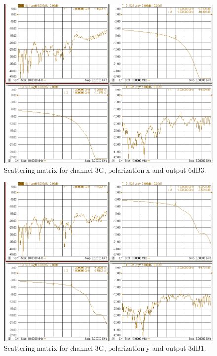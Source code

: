 \documentclass[12pt,a4paper,oneside]{article}
\begin{document}
\begin{figure}[H]
\centering
\includegraphics[width=0.9\linewidth]{VNA_results/3Gx_6dB3.png}
\caption{Scattering matrix for channel 3G, polarization x and output 6dB3.}
\label{fig:3Gx_6dB3}
\end{figure}


\begin{figure}[H]
\centering
\includegraphics[width=0.9\linewidth]{VNA_results/3Gy_3dB1.png}
\caption{Scattering matrix for channel 3G, polarization y and output 3dB1.}
\label{fig:3Gy_3dB1}
\end{figure}
\end{document}
